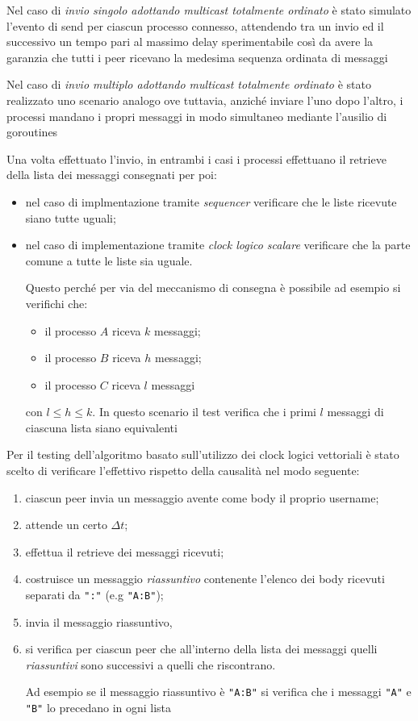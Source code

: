 \documentclass[conference]{IEEEtran}
\begin{document}
Nel caso di \textsl{invio singolo adottando multicast totalmente ordinato} è stato simulato l'evento di send per ciascun processo connesso, attendendo tra un invio ed il successivo un tempo pari al massimo delay sperimentabile così da avere la garanzia che tutti i peer ricevano la medesima sequenza ordinata di messaggi

Nel caso di \textsl{invio multiplo adottando multicast totalmente ordinato} è stato realizzato uno scenario analogo ove tuttavia, anziché inviare l'uno dopo l'altro, i processi mandano i propri messaggi in modo simultaneo mediante l'ausilio di goroutines

Una volta effettuato l'invio, in entrambi i casi i processi effettuano il retrieve della lista dei messaggi consegnati per poi:
\begin{itemize}
\item nel caso di implmentazione tramite \textsl{sequencer} verificare che le liste ricevute siano tutte uguali;
\item nel caso di implementazione tramite \textsl{clock logico scalare} verificare che la parte comune a tutte le liste sia uguale.

Questo perché per via del meccanismo di consegna è possibile ad esempio si verifichi che:
\begin{itemize}
\item il processo $A$ riceva $k$ messaggi;
\item il processo $B$ riceva $h$ messaggi;
\item il processo $C$ riceva $l$ messaggi
\end{itemize}
con $l\leq h\leq k$. In questo scenario il test verifica che i primi $l$ messaggi di ciascuna lista siano equivalenti
\end{itemize}


Per il testing dell'algoritmo basato sull'utilizzo dei clock logici vettoriali è stato scelto di verificare l'effettivo rispetto della causalità nel modo seguente:
\begin{enumerate}
\item ciascun peer invia un messaggio avente come body il proprio username;
\item attende un certo $\Delta t$;
\item effettua il retrieve dei messaggi ricevuti;
\item costruisce un messaggio \textit{riassuntivo} contenente l'elenco dei body ricevuti separati da \texttt{":"} (e.g \texttt{"A:B"});
\item invia il messaggio riassuntivo,
\item si verifica per ciascun peer che all'interno della lista dei messaggi quelli \textit{riassuntivi} sono successivi a quelli che riscontrano.

Ad esempio se il messaggio riassuntivo è \texttt{"A:B"} si verifica che i messaggi \texttt{"A"} e \texttt{"B"} lo precedano in ogni lista
\end{enumerate}
\end{document}
